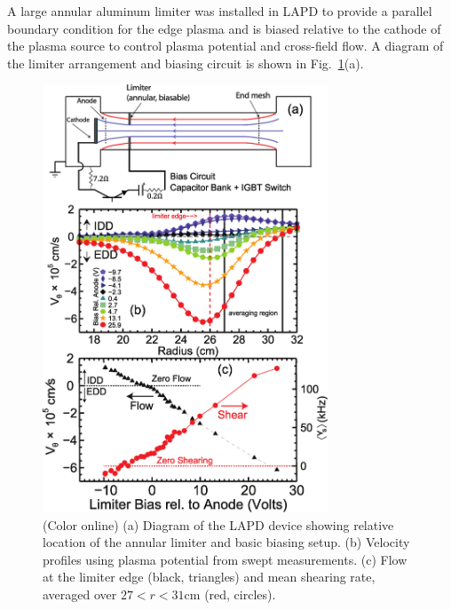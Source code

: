 \documentclass[aip,pop,amsmath,amssymb,peprint,superscriptaddress]{revtex4-1} %
\begin{document}
A large annular aluminum limiter was installed in LAPD to provide a parallel boundary condition for the edge plasma and is biased relative to the cathode of the plasma source to control plasma potential and cross-field flow.  A diagram of the limiter arrangement and biasing circuit is shown in Fig.~\ref{fig:velocity_flowshear}(a).

\begin{figure}[!htbp]
\centerline{
\includegraphics[width=8.5cm]{figure1.eps}}
\caption{\label{fig:velocity_flowshear} (Color online) (a) Diagram of the LAPD device showing relative location of the annular limiter and basic biasing setup.  (b) Velocity profiles using plasma potential from swept measurements. (c) Flow at the limiter edge (black, triangles) and mean shearing rate, averaged over $27 < r < 31$cm (red, circles).}
\end{figure}
\end{document}
